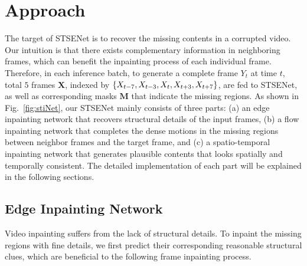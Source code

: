 \section{Approach}
\label{sec:approach}

The target of STSENet is to recover the missing contents in a corrupted video.
%
Our intuition is that there exists complementary information in neighboring frames, which can benefit the inpainting process of each individual frame.
Therefore, in each inference batch, to generate a complete frame \(Y_t\) at time $t$, total $5$ frames $\boldsymbol{X}$, indexed by $\{X_{t-7},X_{t-3},X_{t},X_{t+3},X_{t+7}\}$, are fed to STSENet, as well as corresponding masks $\boldsymbol{M}$ that indicate the missing regions.
%
As shown in Fig.~\ref{fig:stiNet}, our STSENet mainly consists of three parts: (a) an edge inpainting network that recovers structural details of the input frames, (b) a flow inpainting network that completes the dense motions in the missing regions between neighbor frames and the target frame, and (c) a spatio-temporal inpainting network that generates plausible contents that looks spatially and temporally consistent.
The detailed implementation of each part will be explained in the following sections.

 



\subsection{Edge Inpainting Network}
\label{sec:edgenet}

Video inpainting suffers from the lack of structural details.
To inpaint the missing regions with fine details, we first predict their corresponding reasonable structural clues, which are beneficial to the following frame inpainting process.
%

